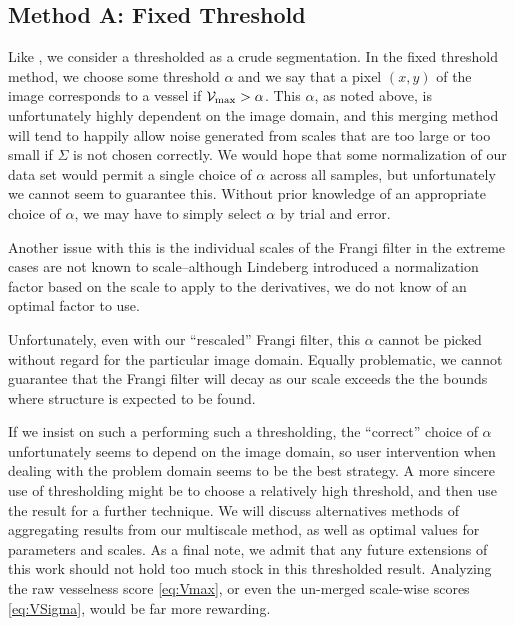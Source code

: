\subsection{Method A: Fixed Threshold}
Like \cite{huynh2013filter}, we consider a thresholded \Vmax{} as a crude segmentation.
In the fixed threshold method, we choose some threshold $\alpha$ and we say that a pixel $(x,y)$ of the image corresponds to a vessel if
$\mathcal{V}_{\max} >  \alpha$. This $\alpha$, as noted above, is unfortunately highly dependent on the image domain, and this merging method will tend to happily allow noise generated from scales that are too large or too small if $\Sigma$ is not chosen correctly. We would hope that some normalization of our data set would permit a single choice of $\alpha$ across all samples, but unfortunately we cannot seem to guarantee this. Without prior knowledge of an appropriate choice of $\alpha$, we may have to simply select $\alpha$ by trial and error.

 Another issue with this is the individual scales of the Frangi filter in the extreme cases are not known to scale--although Lindeberg introduced a normalization factor based on the scale to apply to the derivatives, we do not know of an optimal factor to use.

Unfortunately, even with our ``rescaled'' Frangi filter, this $\alpha$ cannot be picked without regard for the particular image domain. Equally problematic, we cannot guarantee that the Frangi filter will decay as our scale exceeds the the bounds where structure is expected to be found.



If we insist on such a performing such a thresholding, the ``correct'' choice of $\alpha$ unfortunately seems to depend on the image domain, so user intervention when dealing with the problem domain seems to be the best strategy. A more sincere use of thresholding might be to choose a relatively high threshold, and then use the result for a further technique.
We will discuss alternatives methods of aggregating results from our multiscale method, as well as optimal values for parameters and scales. As a final note, we admit that any future extensions of this work should not hold too much stock in this thresholded result. Analyzing the raw vesselness score \cref{eq:Vmax}, or even the un-merged scale-wise scores \cref{eq:VSigma}, would be far more rewarding.
 
